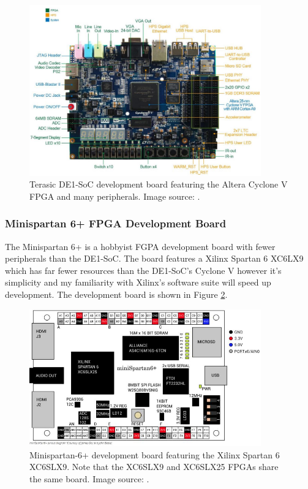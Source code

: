 \documentclass[11pt,a4paper]{report}
\begin{document}
{\begin{figure}[h]
\centering 
\includegraphics[width=10cm]{../img/de1soc}
\caption{Terasic DE1-SoC development board featuring the Altera Cyclone V FPGA and many peripherals. Image source: \cite{de1soc}.}
\label{fig:de1soc}
\end{figure}

\subsubsection{Minispartan 6+ FPGA Development Board}
The Minispartan 6+ is a hobbyist FGPA development board with fewer peripherals than the DE1-SoC. The board features a Xilinx Spartan 6 XC6LX9 which has far fewer resources than the DE1-SoC's Cyclone V however it's simplicity and my familiarity with  Xilinx's software suite will speed up development. The development board is shown in Figure \ref{fig:minispartan}.

\begin{figure}[h]
\centering 
\includegraphics[width=10cm]{../img/minispartan}
\caption{Minispartan-6+ development board featuring the Xilinx Spartan 6 XC6SLX9. Note that the XC6SLX9 and XC6SLX25 FPGAs share the same board. Image source: \cite{scarabhardware}.}
\label{fig:minispartan}
\end{figure}

}
\end{document}
